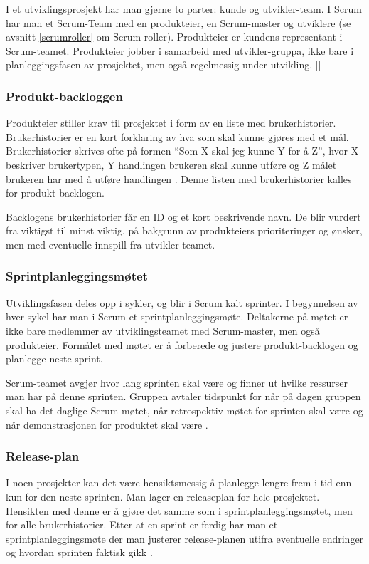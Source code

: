 \documentclass[12pt,a4paper,norsk]{article}
\begin{document}
	I et utviklingsprosjekt har man gjerne to parter: kunde og utvikler-team. I Scrum har man et Scrum-Team med en produkteier, en Scrum-master og utviklere (se avsnitt \ref{scrumroller} om Scrum-roller). Produkteier er kundens representant i Scrum-teamet. Produkteier jobber i samarbeid med utvikler-gruppa, ikke bare i planleggingsfasen av prosjektet, men også regelmessig under utvikling.
	[\cite{scrumguides}]
	\subsubsection{Produkt-backloggen}
	Produkteier stiller krav til prosjektet i form av en liste med brukerhistorier. Brukerhistorier er en kort forklaring av hva som skal kunne gjøres med et mål. Brukerhistorier skrives ofte på formen “Som X skal jeg kunne Y for å Z”, hvor X beskriver brukertypen, Y handlingen brukeren skal kunne utføre og Z målet brukeren har med å utføre handlingen \cite[side 9]{kniberg}. Denne listen med brukerhistorier kalles for produkt-backlogen.

    Backlogens brukerhistorier får en ID og et kort beskrivende navn. De blir vurdert fra viktigst til minst viktig, på bakgrunn av produkteiers prioriteringer og ønsker, men med eventuelle innspill fra utvikler-teamet.
	\subsubsection{Sprintplanleggingsmøtet}
	Utviklingsfasen deles opp i sykler, og blir i Scrum kalt sprinter. I begynnelsen av hver sykel har man i Scrum et sprintplanleggingsmøte. Deltakerne på møtet er ikke bare medlemmer av utviklingsteamet med Scrum-master, men også produkteier. Formålet med møtet er å forberede og justere produkt-backlogen og planlegge neste sprint.

    Scrum-teamet avgjør hvor lang sprinten skal være og finner ut hvilke ressurser man har på denne sprinten. Gruppen avtaler tidspunkt for når på dagen gruppen skal ha det daglige Scrum-møtet, når retrospektiv-møtet for sprinten skal være og når demonstrasjonen for produktet skal være \cite[side 16]{kniberg}.
	\subsubsection{Release-plan}
	I noen prosjekter kan det være hensiktsmessig å planlegge lengre frem i tid enn kun for den neste sprinten. Man lager en releaseplan for hele prosjektet. Hensikten med denne er å gjøre det samme som i sprintplanleggingsmøtet, men for alle brukerhistorier. Etter at en sprint er ferdig har man et sprintplanleggingsmøte der man justerer release-planen utifra eventuelle endringer og hvordan sprinten faktisk gikk \cite[side 95 - 101]{kniberg}.
\end{document}

